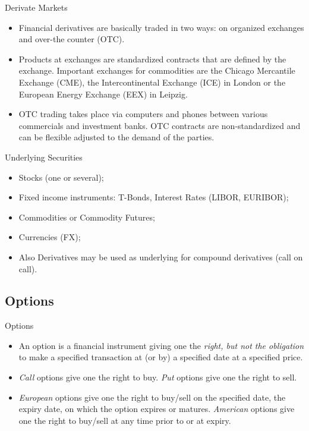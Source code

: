 {Derivate Markets}
\begin{itemize}
  \item<1-> Financial derivatives are basically traded in two ways: on organized exchanges and over-the counter (OTC).
  \item<2-> Products at exchanges are standardized contracts that are defined by the exchange. Important exchanges for commodities are the Chicago Mercantile Exchange (CME), the Intercontinental Exchange (ICE) in London or the European Energy Exchange (EEX) in Leipzig.
  \item<3-> OTC trading takes place via computers and phones between various commercials and investment banks. OTC contracts are non-standardized and can be flexible adjusted to the demand of the parties.
\end{itemize}

{Underlying Securities}

\begin{itemize}
\item<1-> Stocks (one or several);
\item<2-> Fixed income instruments: T-Bonds, Interest Rates (LIBOR, EURIBOR);
\item<3-> Commodities or Commodity Futures;
\item<4-> Currencies (FX);
\item<5-> Also Derivatives may be used as underlying for compound derivatives (call on call).
\end{itemize}

\subsection{Options}

{Options}

\begin{itemize}
 \item<1->  An option is a financial instrument giving one the {\it right, but
not the obligation} to make a specified transaction at (or by) a
specified date at a specified price.
\item<2->{\it Call} options give one
the right to buy. {\it Put} options give one the right to sell.
\item<3-> {\it European} options give one the right to buy/sell on the
specified date, the expiry date, on which the option expires or
matures. {\it American} options give one the right to buy/sell at any time
prior to or at expiry.
\end{itemize}

